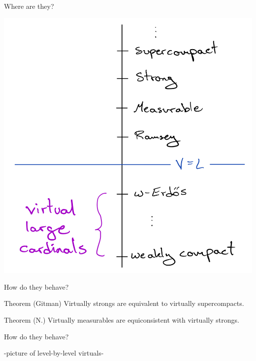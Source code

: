 \documentclass{beamer}
\begin{document}
\begin{frame}{Where are they?}
  \begin{center}
    \includegraphics[scale=.2]{gfx/hierarchy.jpg}
  \end{center}
\end{frame}

\begin{frame}{How do they behave?}
  \begin{block}{Theorem (Gitman)}
    Virtually strongs are equivalent to virtually supercompacts.
  \end{block}

  \pause

  \begin{block}{Theorem (N.)}
    Virtually measurables are equiconsistent with virtually strongs.
  \end{block}
\end{frame}

\begin{frame}{How do they behave?}
  \begin{center}
    -picture of level-by-level virtuals- 
  \end{center}
\end{frame}
\end{document}
